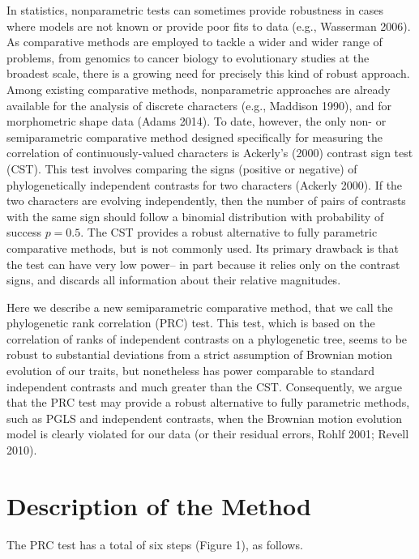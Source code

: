\documentclass[fleqn,10pt,lineno]{wlpeerj} %
\begin{document}
In statistics, nonparametric tests can sometimes provide robustness in cases where models are not known or provide poor fits to data (e.g., Wasserman 2006). As comparative methods are employed to tackle a wider and wider range of problems, from genomics to cancer biology to evolutionary studies at the broadest scale, there is a growing need for precisely this kind of robust approach. Among existing comparative methods, nonparametric approaches are already available for the analysis of discrete characters (e.g., Maddison 1990), and for morphometric shape data (Adams 2014). To date, however, the only non- or semiparametric comparative method designed specifically for measuring the correlation of continuously-valued characters is Ackerly's (2000) contrast sign test (CST). This test involves comparing the signs (positive or negative) of phylogenetically independent contrasts for two characters (Ackerly 2000). If the two characters are evolving independently, then the number of pairs of contrasts with the same sign should follow a binomial distribution with probability of success \(p=0.5\). The CST provides a robust alternative to fully parametric comparative methods, but is not commonly used. Its primary drawback is that the test can have very low power-- in part because it relies only on the contrast signs, and discards all information about their relative magnitudes.

Here we describe a new semiparametric comparative method, that we call the phylogenetic rank correlation (PRC) test. This test, which is based on the correlation of ranks of independent contrasts on a phylogenetic tree, seems to be robust to substantial deviations from a strict assumption of Brownian motion evolution of our traits, but nonetheless has power comparable to standard independent contrasts and much greater than the CST. Consequently, we argue that the PRC test may provide a robust alternative to fully parametric methods, such as PGLS and independent contrasts, when the Brownian motion evolution model is clearly violated for our data (or their residual errors, Rohlf 2001; Revell 2010).

\section{Description of the Method}\label{description-of-the-method}

The PRC test has a total of six steps (Figure 1), as follows.
\end{document}
